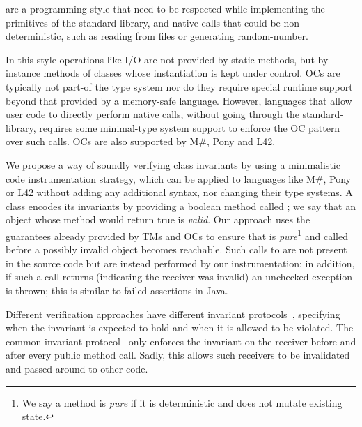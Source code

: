 
 are a programming style that need to be respected while implementing the primitives of the standard library, and native calls that could be non deterministic, such as reading from files or generating random-number.

In this style operations like I/O are not provided by static methods, but by instance methods of classes whose instantiation is kept under control.
OCs are typically not part-of the type system nor do they require special runtime support beyond that provided by a memory-safe language. However, languages that allow user code to directly perform native calls, without going through the standard-library, requires some minimal-type system support to enforce the OC pattern over such calls.
OCs are also supported by M\#, Pony and L42.




We propose a way of soundly verifying class invariants by using a minimalistic code instrumentation strategy, which can be applied to languages like M\#, Pony or  L42  without adding any additional syntax, nor changing their type systems.
 A class encodes its invariants by providing a boolean method called \Q@invariant@; we say that an object whose \Q@invariant@ method would return true is \emph{valid}. Our approach uses the guarantees already provided by TMs and OCs to ensure that \Q@invariant@ is \emph{pure}\footnote{We say a method is \emph{pure} if it is deterministic and does not mutate existing state.} and called before a possibly invalid object becomes reachable. Such calls to \Q@invariant@ are not present in the source code but are instead performed by our instrumentation; in addition, if such a call returns \Q@false@ (indicating the receiver was invalid) an unchecked exception is thrown; this is similar to failed assertions in Java.

Different verification approaches have different invariant protocols~\cite{FlexibleInvariants}, specifying when the invariant is expected to hold and when it is allowed to be violated.
The common invariant protocol~\cite{?}
only enforces the invariant on the receiver before and after every public method call. Sadly, this allows such receivers to be invalidated and passed around to other code.

